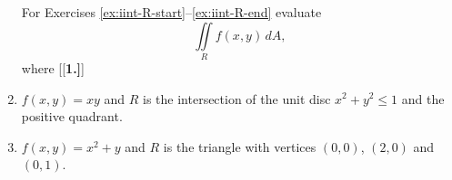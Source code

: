 \begin{enumerate}[\bfseries 1.]
For Exercises \ref{ex:iint-R-start}--\ref{ex:iint-R-end} evaluate 
 \[\iint\limits_{R} f(x,y)\,dA,\]
 where
[{[\bfseries 1.]}]
\item\label{ex:iint-R-start}  $f(x,y)=xy$ and $R$ is the intersection of the unit disc $x^2+y^2\le 1$ and the positive quadrant.
\item\label{ex:iint-R-end}  $f(x,y)=x^2+y$ and $R$ is the triangle with vertices $(0,0)$, $(2,0)$ and $(0,1)$.
 

\end{enumerate}
